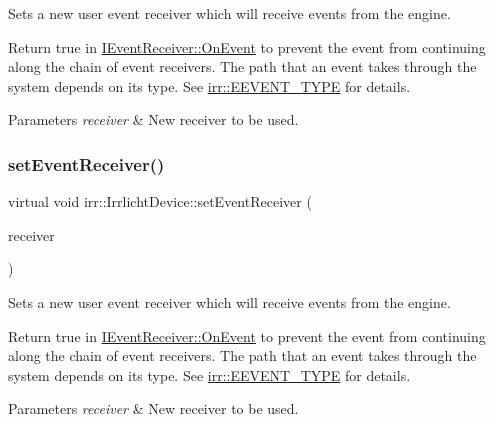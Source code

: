 Sets a new user event receiver which will receive events from the engine. 

Return true in \hyperlink{classirr_1_1IEventReceiver_a571f744ceffc3b4fe8a81f529163eb97}{I\+Event\+Receiver\+::\+On\+Event} to prevent the event from continuing along the chain of event receivers. The path that an event takes through the system depends on its type. See \hyperlink{namespaceirr_ac9eed96e06e85ce3c86fcbbbe9e48a0c}{irr\+::\+E\+E\+V\+E\+N\+T\+\_\+\+T\+Y\+PE} for details. 
\begin{DoxyParams}{Parameters}
{\em receiver} & New receiver to be used. \\
\hline
\end{DoxyParams}
\mbox{\label{classirr_1_1IrrlichtDevice_abf71a5ed6bb6b287e769f699010cedf0}} 
\subsubsection{\texorpdfstring{set\+Event\+Receiver()}{setEventReceiver()}\hspace{0.1cm}{\footnotesize\ttfamily [3/3]}}
{\footnotesize\ttfamily virtual void irr\+::\+Irrlicht\+Device\+::set\+Event\+Receiver (\begin{DoxyParamCaption}\item[{\hyperlink{classirr_1_1IEventReceiver}{I\+Event\+Receiver} $\ast$}]{receiver }\end{DoxyParamCaption})\hspace{0.3cm}{\ttfamily [pure virtual]}}



Sets a new user event receiver which will receive events from the engine. 

Return true in \hyperlink{classirr_1_1IEventReceiver_a571f744ceffc3b4fe8a81f529163eb97}{I\+Event\+Receiver\+::\+On\+Event} to prevent the event from continuing along the chain of event receivers. The path that an event takes through the system depends on its type. See \hyperlink{namespaceirr_ac9eed96e06e85ce3c86fcbbbe9e48a0c}{irr\+::\+E\+E\+V\+E\+N\+T\+\_\+\+T\+Y\+PE} for details. 
\begin{DoxyParams}{Parameters}
{\em receiver} & New receiver to be used. \\
\hline
\end{DoxyParams}
\mbox{\label{classirr_1_1IrrlichtDevice_a22ab84f23050dbef122f16a33aa9b91d}} 
